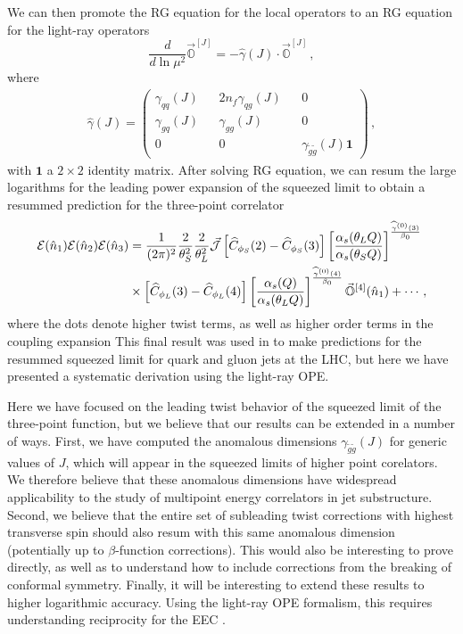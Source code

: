 \documentclass[letterpaper,11pt]{article}
\def\beq{\begin{equation}}
\def\eeq{\end{equation}}
\def\nn{{\nonumber}}
\def\beq{\begin{equation}}
\def\eeq{\end{equation}}
\begin{document}
We can then promote the RG equation for the local operators to an RG equation for the light-ray operators
\beq
\frac{d}{d\ln \mu^2}\vec{\mathbb{O}}^{[J]}=-\hat{\gamma}(J)\cdot \vec{\mathbb{O}}^{[J]}\,,
\eeq
where 
\begin{align}\label{eq:anom_dim}
\hat \gamma(J)=
\begin{pmatrix}
\gamma_{qq}(J)&&2n_f \gamma_{qg}(J)&&0\\
\gamma_{gq}(J)&& \gamma_{gg}(J)&&0\\
0&&0&& \gamma_{\tilde g \tilde g}(J)\mathbf{1}
\end{pmatrix}\,,
\end{align}
with $\mathbf{1}$ a $2\times 2$ identity matrix. After solving RG equation, we can resum the large logarithms for the leading power expansion of the squeezed limit to obtain a resummed prediction for the three-point correlator
\begin{align}
\mathcal{E}(\hat n_1) \mathcal{E}(\hat n_2) \mathcal{E}(\hat n_3)
&=\frac{1}{(2\pi)^2} \frac{2}{\theta_S^2}\frac{2}{\theta_L^2} \vec {\cal J} \left[ \widehat C_{\phi_S}(2)- \widehat C_{\phi_S}(3)  \right] \left[ \frac{\alpha_s(\theta_L Q)}{\alpha_s(\theta_S Q)}\right]^{\frac{\widehat \gamma^{(0)}(3)}{\beta_0}}  \nn \\
&\times \left[ \widehat C_{\phi_L}(3)-\widehat C_{\phi_L}(4)  \right]  \left[ \frac{\alpha_s(Q)}{\alpha_s(\theta_L Q)}\right]^{\frac{\widehat \gamma ^{(0)}(4)}{\beta_0}} 
\vec {\mathbb{O}}^{[4]} (\hat n_1) 
%
+\cdots\,,
\end{align}
where the dots denote higher twist terms, as well as higher order terms in the coupling expansion
This final result was used in \cite{Chen:2020adz} to make predictions for the resummed squeezed limit for quark and gluon jets at the LHC, but here we have presented a systematic derivation using the light-ray OPE.

Here we have focused on the leading twist behavior of the squeezed limit of the three-point function, but we believe that our results can be extended in a number of ways. First, we have computed the anomalous dimensions $\gamma_{\tilde g \tilde g}(J)$ for generic values of $J$, which will appear in the squeezed limits of higher point corelators. We therefore believe that these anomalous dimensions have widespread applicability to the study of multipoint energy correlators in jet substructure. Second, we believe that the entire set of subleading twist corrections with highest transverse spin should also resum with this same anomalous dimension (potentially up to $\beta$-function corrections). This would also be interesting to prove directly, as well as to understand how to include corrections from the breaking of conformal symmetry. Finally, it will be interesting to extend these results to higher logarithmic accuracy. Using the light-ray OPE formalism, this requires understanding reciprocity \cite{Basso:2006nk,Chen:2020uvt} for the EEC \cite{Dixon:2019uzg}. 
\end{document}

